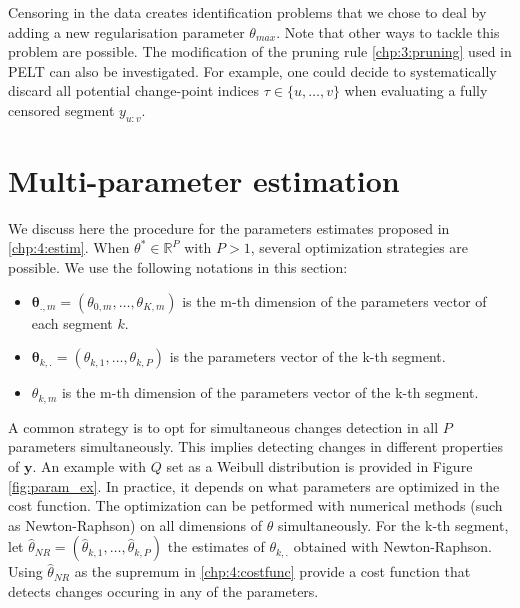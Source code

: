 Censoring in the data creates identification problems that we chose to deal by adding a new regularisation parameter $\theta_{max}$. Note that other ways to tackle this problem are possible. The modification of the pruning rule \ref{chp:3:pruning} used in PELT can also be investigated. For example, one could decide to systematically discard all potential change-point indices $\tau \in \{u,\dots,v\}$ when evaluating a fully censored segment $y_{u:v}$.  

\section{Multi-parameter estimation}\label{chp:4:3}

We discuss here the procedure for the parameters estimates proposed in \ref{chp:4:estim}. When $\theta^* \in \mathbb{R}^P$ with $P > 1$, several optimization strategies are possible. We use the following notations in this section: 
\begin{itemize}
\item $\bm \theta_{.,m} = (\theta_{0,m},\dots,\theta_{K,m})$ is the m-th dimension of the parameters vector of each segment $k$.
\item $\bm \theta_{k,.} = (\theta_{k,1},\dots,\theta_{k,P})$ is the parameters vector of the k-th segment.
\item $\theta_{k,m}$ is the m-th dimension of the parameters vector of the k-th segment.
\end{itemize}

A common strategy is to opt for simultaneous changes detection in all $P$ parameters simultaneously. This implies detecting changes in different properties of $\bm y$. An example with $Q$ set as a Weibull distribution is provided in Figure \ref{fig:param_ex}. In practice, it depends on what parameters are optimized in the cost function. The optimization can be petformed with numerical methods (such as Newton-Raphson) on all dimensions of $\theta$ simultaneously. For the k-th segment, let $\widehat{\theta}_{NR} = (\widehat{\theta}_{k,1},\dots,\widehat{\theta}_{k,P})$ the estimates of $\theta_{k,.}$ obtained with Newton-Raphson. Using $\widehat{\theta}_{NR}$ as the supremum in \ref{chp:4:costfunc} provide a cost function that detects changes occuring in any of the parameters.  

